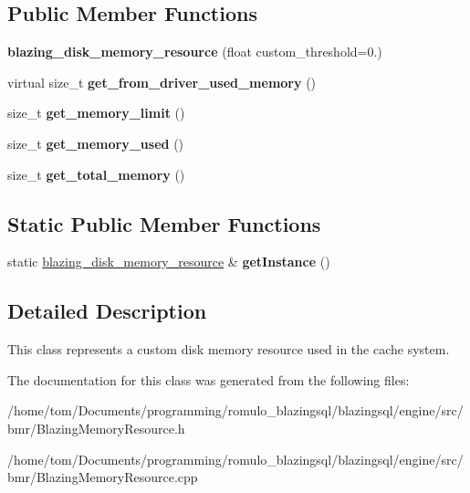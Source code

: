 \subsection*{Public Member Functions}
\begin{DoxyCompactItemize}
\item 
\mbox{\label{classblazing__disk__memory__resource_a67b8830405d101003182307a82f798d3}} 
{\bfseries blazing\+\_\+disk\+\_\+memory\+\_\+resource} (float custom\+\_\+threshold=0.)
\item 
\mbox{\label{classblazing__disk__memory__resource_ad4651b8b5e16a09108caa6f8b681c46a}} 
virtual size\+\_\+t {\bfseries get\+\_\+from\+\_\+driver\+\_\+used\+\_\+memory} ()
\item 
\mbox{\label{classblazing__disk__memory__resource_ac035ec9b3f7ef86b87c7ed634ee10673}} 
size\+\_\+t {\bfseries get\+\_\+memory\+\_\+limit} ()
\item 
\mbox{\label{classblazing__disk__memory__resource_a62e42fcf3251e1591c7a55f45fc5a8a0}} 
size\+\_\+t {\bfseries get\+\_\+memory\+\_\+used} ()
\item 
\mbox{\label{classblazing__disk__memory__resource_a7b38ea651ff546fd6b2c5f4dfaee14d0}} 
size\+\_\+t {\bfseries get\+\_\+total\+\_\+memory} ()
\end{DoxyCompactItemize}
\subsection*{Static Public Member Functions}
\begin{DoxyCompactItemize}
\item 
\mbox{\label{classblazing__disk__memory__resource_ade7d366346c83c832365cca2f913d08f}} 
static \hyperlink{classblazing__disk__memory__resource}{blazing\+\_\+disk\+\_\+memory\+\_\+resource} \& {\bfseries get\+Instance} ()
\end{DoxyCompactItemize}


\subsection{Detailed Description}
This class represents a custom disk memory resource used in the cache system. 

The documentation for this class was generated from the following files\+:\begin{DoxyCompactItemize}
\item 
/home/tom/\+Documents/programming/romulo\+\_\+blazingsql/blazingsql/engine/src/bmr/Blazing\+Memory\+Resource.\+h\item 
/home/tom/\+Documents/programming/romulo\+\_\+blazingsql/blazingsql/engine/src/bmr/Blazing\+Memory\+Resource.\+cpp\end{DoxyCompactItemize}

